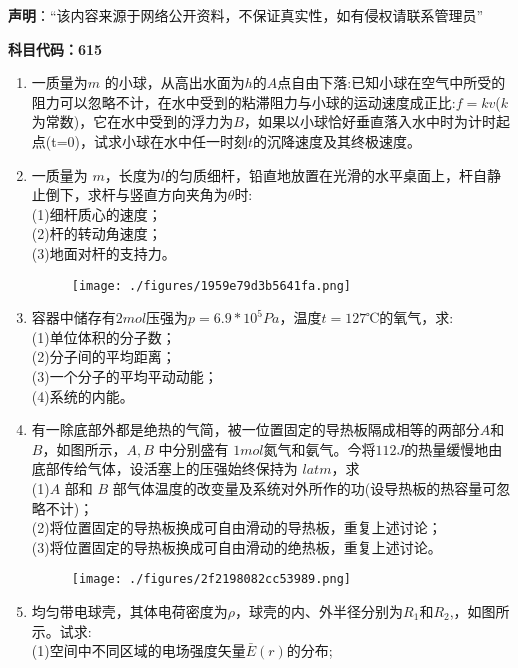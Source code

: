 

\textbf{声明}：“该内容来源于网络公开资料，不保证真实性，如有侵权请联系管理员”


\textbf{科目代码：615}

\begin{enumerate}
\item 一质量为$ m$ 的小球，从高出水面为$h$的$ A $点自由下落:已知小球在空气中所受的阻力可以忽略不计，在水中受到的粘滞阻力与小球的运动速度成正比:$f=kv$($k$为常数)，它在水中受到的浮力为$ B$，如果以小球恰好垂直落入水中时为计时起点(t=0)，试求小球在水中任一时刻$t$的沉降速度及其终极速度。
\item 一质量为 $m$，长度为$l$的匀质细杆，铅直地放置在光滑的水平桌面上，杆自静止倒下，求杆与竖直方向夹角为$\theta$时:\\
(1)细杆质心的速度；\\
(2)杆的转动角速度；\\
(3)地面对杆的支持力。
\begin{figure}[ht]
\centering
\texttt{[image: ./figures/1959e79d3b5641fa.png]}
\caption{} \label{fig_XD08_1}
\end{figure}
\item 容器中储存有$2mol $压强为$ p=6.9*10^5Pa$，温度$t=127$℃的氧气，求:\\
(1)单位体积的分子数；\\
(2)分子间的平均距离；\\
(3)一个分子的平均平动动能；\\
(4)系统的内能。
\item 有一除底部外都是绝热的气简，被一位置固定的导热板隔成相等的两部分$A$和 $B$，如图所示，$A,B$ 中分别盛有 $1mol$氮气和氨气。今将$112J$的热量缓慢地由底部传给气体，设活塞上的压强始终保持为 $latm$，求\\
(1)$A$ 部和 $B$ 部气体温度的改变量及系统对外所作的功(设导热板的热容量可忽略不计)；\\
(2)将位置固定的导热板换成可自由滑动的导热板，重复上述讨论；\\
(3)将位置固定的导热板换成可自由滑动的绝热板，重复上述讨论。
\begin{figure}[ht]
\centering
\texttt{[image: ./figures/2f2198082cc53989.png]}
\caption{} \label{fig_XD08_2}
\end{figure}
\item 均匀带电球壳，其体电荷密度为$\rho$，球壳的内、外半径分别为$R_1$和$R_2$,，如图所示。试求:\\
(1)空间中不同区域的电场强度矢量$\bar E(r)$的分布;\\

\end{enumerate}
